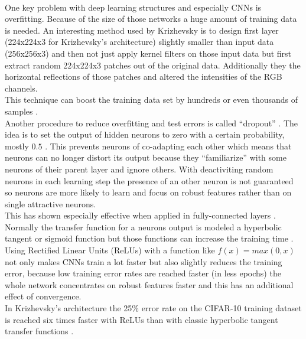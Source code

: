 \documentclass[12pt,twoside]{article}
\theoremstyle{plain}
\theoremstyle{definition}
\theoremstyle{remark}
\begin{document}
\\
One key problem with deep learning structures and especially CNNs is overfitting. Because of the size of those networks a huge amount of training data is needed. An interesting method used by Krizhevsky is to design first layer (224x224x3 for Krizhevsky's architecture) slightly smaller than input data (256x256x3) and then not just apply kernel filters on those input data but first extract random 224x224x3 patches out of the original data. Additionally they the horizontal reflections of those patches and altered the intensities of the RGB channels.
\\
This technique can boost the training data set by hundreds or even thousands of samples \cite{ImangeNetClassificationCNN-Krizhevsky}.
\\
Another procedure to reduce overfitting and test errors is called \enquote{dropout} \cite{ImprovingNeuralNetworksDropout-Hinton-Krizhevsky}. The idea is to set the output of hidden neurons to zero with a certain probability, mostly $0.5$ \cite{ImangeNetClassificationCNN-Krizhevsky}. This prevents neurons of co-adapting each other which means that neurons can no longer distort its output because they \enquote{familiarize} with some neurons of their parent layer and ignore others. With deactiviting random neurons in each learning step the presence of an other neuron is not guaranteed so neurons are more likely to learn and focus on robust features rather than on single attractive neurons.
\\
This has shown especially effective when applied in fully-connected layers \cite{ImangeNetClassificationCNN-Krizhevsky}.
\\
Normally the transfer function for a neurons output is modeled a hyperbolic tangent or sigmoid function but those functions can increase the training time \cite{ImangeNetClassificationCNN-Krizhevsky}. Using Rectified Linear Units (ReLUs) \cite{RectifiedLinearUnits-Hinton} with a function like $f(x) = max(0, x)$ not only makes CNNs train a lot faster but also slightly reduces the training error, because low training error rates are reached faster (in less epochs) the whole network concentrates on robust features faster and this has an additional effect of convergence.
\\
In Krizhevsky's architecture the 25\% error rate on the CIFAR-10 training dataset is reached six times faster with ReLUs than with classic hyperbolic tangent transfer functions \cite{ImangeNetClassificationCNN-Krizhevsky}.
\end{document}
